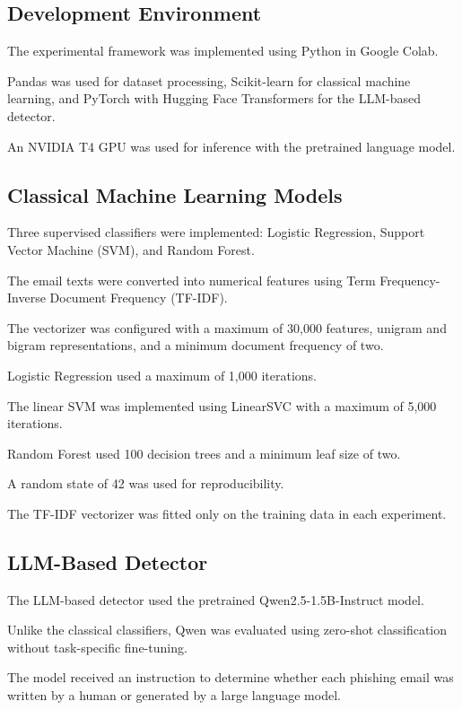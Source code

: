 \documentclass[sigconf,nonacm]{acmart}
\begin{document}
\subsection{Development Environment}

The experimental framework was implemented
using Python in Google Colab.

Pandas was used for dataset processing,
Scikit-learn for classical machine learning,
and PyTorch with Hugging Face Transformers
for the LLM-based detector.

An NVIDIA T4 GPU was used for inference
with the pretrained language model.

\subsection{Classical Machine Learning Models}

Three supervised classifiers were implemented:
Logistic Regression, Support Vector Machine
(SVM), and Random Forest.

The email texts were converted into numerical
features using Term Frequency-Inverse Document
Frequency (TF-IDF).

The vectorizer was configured with a maximum
of 30,000 features, unigram and bigram
representations, and a minimum document
frequency of two.

Logistic Regression used a maximum of
1,000 iterations.

The linear SVM was implemented using
LinearSVC with a maximum of 5,000 iterations.

Random Forest used 100 decision trees
and a minimum leaf size of two.

A random state of 42 was used for
reproducibility.

The TF-IDF vectorizer was fitted only
on the training data in each experiment.

\subsection{LLM-Based Detector}

The LLM-based detector used the pretrained
Qwen2.5-1.5B-Instruct model.

Unlike the classical classifiers, Qwen
was evaluated using zero-shot classification
without task-specific fine-tuning.

The model received an instruction to
determine whether each phishing email
was written by a human or generated
by a large language model.
\end{document}
